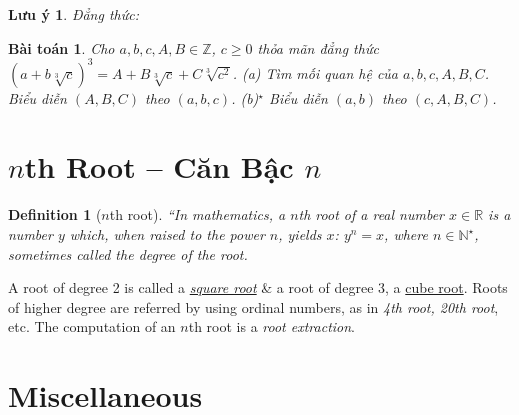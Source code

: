 \documentclass{article}
\newtheorem{baitoan}{Bài toán}
\newtheorem{definition}{Definition}
\newtheorem{luuy}{Lưu ý}
\begin{document}
\begin{luuy}
	Đẳng thức: 
\end{luuy}

\begin{baitoan}
	Cho $a,b,c,A,B\in\mathbb{Z}$, $c\ge0$ thỏa mãn đẳng thức $(a + b\sqrt[3]{c})^3 = A + B\sqrt[3]{c} + C\sqrt[3]{c^2}$. (a) Tìm mối quan hệ của $a,b,c,A,B,C$. Biểu diễn $(A,B,C)$ theo $(a,b,c)$. (b)${}^\star$ Biểu diễn $(a,b)$ theo $(c,A,B,C)$.
\end{baitoan}


\section{$n$th Root -- Căn Bậc $n$}

\begin{definition}[$n$th root]
	``In mathematics, a \emph{$n$th root} of a real number $x\in\mathbb{R}$ is a number $y$ which, when raised to the power $n$, yields $x$: $y^n = x$, where $n\in\mathbb{N}^\star$, sometimes called the \emph{degree} of the root.
\end{definition}
A root of degree 2 is called a \href{https://en.wikipedia.org/wiki/Square_root}{\textit{square root}} \& a root of degree 3, a \href{https://en.wikipedia.org/wiki/Cube_root}{cube root}. Roots of higher degree are referred by using ordinal numbers, as in \textit{4th root, 20th root}, etc. The computation of an $n$th root is a \textit{root extraction}.


\section{Miscellaneous}


\printbibliography[heading=bibintoc]
	
\end{document}

